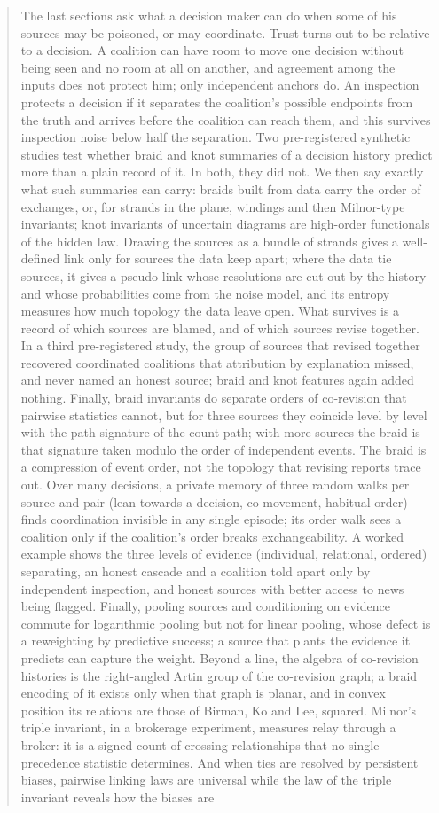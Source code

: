 \documentclass[11pt]{article}
\theoremstyle{definition}\newtheorem{definition}[theorem]{Definition}\newtheorem{remark}[theorem]{Remark}\newtheorem{example}[theorem]{Example}\newtheorem{problem}[theorem]{Open problem}\crefname{problem}{Problem}{Problems}
\begin{document}
\begin{abstract}
The last sections ask what a decision maker can do when some of his sources may be poisoned, or may coordinate. Trust turns out to be relative to a decision. A coalition can have room to move one decision without being seen and no room at all on another, and agreement among the inputs does not protect him; only independent anchors do. An inspection protects a decision if it separates the coalition's possible endpoints from the truth and arrives before the coalition can reach them, and this survives inspection noise below half the separation. Two pre-registered synthetic studies test whether braid and knot summaries of a decision history predict more than a plain record of it. In both, they did not. We then say exactly what such summaries can carry: braids built from data carry the order of exchanges, or, for strands in the plane, windings and then Milnor-type invariants; knot invariants of uncertain diagrams are high-order functionals of the hidden law. Drawing the sources as a bundle of strands gives a well-defined link only for sources the data keep apart; where the data tie sources, it gives a pseudo-link whose resolutions are cut out by the history and whose probabilities come from the noise model, and its entropy measures how much topology the data leave open. What survives is a record of which sources are blamed, and of which sources revise together. In a third pre-registered study, the group of sources that revised together recovered coordinated coalitions that attribution by explanation missed, and never named an honest source; braid and knot features again added nothing. Finally, braid invariants do separate orders of co-revision that pairwise statistics cannot, but for three sources they coincide level by level with the path signature of the count path; with more sources the braid is that signature taken modulo the order of independent events. The braid is a compression of event order, not the topology that revising reports trace out. Over many decisions, a private memory of three random walks per source and pair (lean towards a decision, co-movement, habitual order) finds coordination invisible in any single episode; its order walk sees a coalition only if the coalition's order breaks exchangeability. A worked example shows the three levels of evidence (individual, relational, ordered) separating, an honest cascade and a coalition told apart only by independent inspection, and honest sources with better access to news being flagged. Finally, pooling sources and conditioning on evidence commute for logarithmic pooling but not for linear pooling, whose defect is a reweighting by predictive success; a source that plants the evidence it predicts can capture the weight. Beyond a line, the algebra of co-revision histories is the right-angled Artin group of the co-revision graph; a braid encoding of it exists only when that graph is planar, and in convex position its relations are those of Birman, Ko and Lee, squared. Milnor's triple invariant, in a brokerage experiment, measures relay through a broker: it is a signed count of crossing relationships that no single precedence statistic determines. And when ties are resolved by persistent biases, pairwise linking laws are universal while the law of the triple invariant reveals how the biases are 
\end{abstract}
\end{document}
